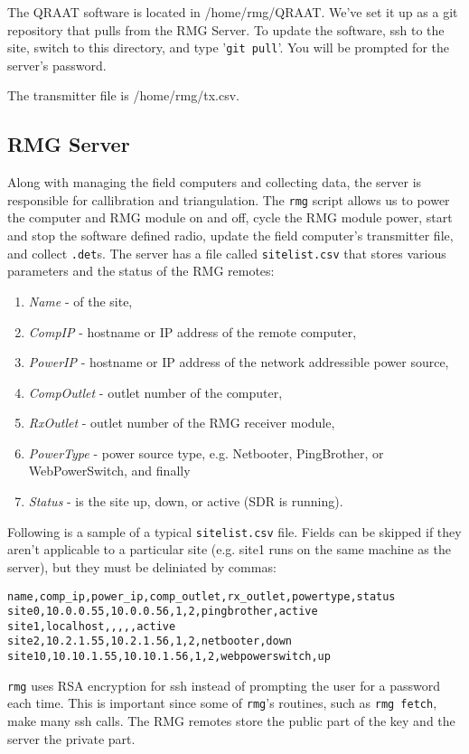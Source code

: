 \documentclass[letter]{article}
\begin{document}
The QRAAT software is located in /home/rmg/QRAAT. We've set it up as a git 
repository that pulls from the RMG Server. To update the software, ssh to the site, 
switch to this directory, and type '\texttt{git pull}'. You will be prompted for 
the server's password.  

The transmitter file is /home/rmg/tx.csv. 

\subsection{RMG Server}
Along with managing the field computers and collecting data, the server is responsible for
callibration and triangulation. The \texttt{rmg} script allows us to power the computer and 
RMG module on and off, cycle the RMG module power, start and stop the software defined radio, 
update the field computer's transmitter file, and collect \texttt{.det}s. The server has a 
file called \texttt{sitelist.csv} that stores various parameters and the status of the RMG remotes:
\begin{enumerate}
  \item \textit{Name} - of the site, 
  \item \textit{CompIP} - hostname or IP address of the remote computer, 
  \item \textit{PowerIP} - hostname or IP address of the network addressible power source,
  \item \textit{CompOutlet} - outlet number of the computer, 
  \item \textit{RxOutlet} - outlet number of the RMG receiver module, 
  \item \textit{PowerType} - power source type, e.g. Netbooter, PingBrother, or WebPowerSwitch, and finally
  \item \textit{Status} - is the site up, down, or active (SDR is running). 
\end{enumerate}
Following is a sample of a typical \texttt{sitelist.csv} file. Fields can be skipped if they aren't applicable
to a particular site (e.g. site1 runs on the same machine as the server), but they must be deliniated by 
commas:
\begin{verbatim}
name,comp_ip,power_ip,comp_outlet,rx_outlet,powertype,status
site0,10.0.0.55,10.0.0.56,1,2,pingbrother,active
site1,localhost,,,,,active
site2,10.2.1.55,10.2.1.56,1,2,netbooter,down
site10,10.10.1.55,10.10.1.56,1,2,webpowerswitch,up
\end{verbatim}

\texttt{rmg} uses RSA encryption for ssh instead of prompting the user for a password each time. This is 
important since some of \texttt{rmg}'s routines, such as \texttt{rmg fetch}, make many ssh calls. The 
RMG remotes store the public part of the key and the server the private part. 
\end{document}
